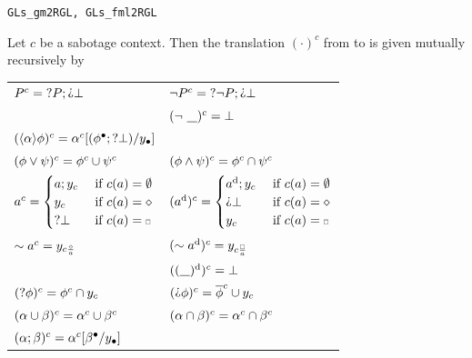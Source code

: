 \begin{bdefinition}
\texttt{GLs\_gm2RGL, GLs\_fml2RGL}

Let $c$ be a sabotage context. Then the translation $(\cdot)^c$ from \GLs{} to \RGL{} is given mutually recursively by
\begin{center}
\begin{tabular}{l l}
    $ \GLsrl{c}{P} = \Test P; \DTest\bot$ 
    & $\GLsrl{c}{\neg P } = \Test\neg P; \DTest\bot$ \\
    & $\GLsrl{c}{(\neg\  \underline{\hspace{8pt}})} = \bot$ \\
    $\GLsrl{c}{(\langle\alpha\rangle\phi)} = \GLsrl{c}{\alpha}[(\GLsrl{\bullet}{\phi}; \Test\bot)/y_\bullet]$ \\
    $\GLsrl{c}{(\phi\vee\psi)}=\GLsrl{c}{\phi}\cup \GLsrl{c}{\psi}$ 
    & $\GLsrl{c}{(\phi\wedge\psi)}=\GLsrl{c}{\phi}\cap \GLsrl{c}{\psi}$ \\
    $\GLsrl{c}{a} =\begin{cases}
        a; y_c & \text{ if } c(a) = \emptyset \\
        y_c     & \text{ if } c(a) = \diamond \\
        \Test \bot  & \text{ if } c(a) = \ssquare
    \end{cases}$ 
    & $\GLsrl{c}{(\Dual{a})} =\begin{cases}
        \Dual{a}; y_c & \text{ if } c(a) = \emptyset \\
        \DTest\bot     & \text{ if } c(a) = \diamond \\
        y_c  & \text{ if } c(a) = \ssquare
    \end{cases}$ \\
    $\GLsrl{c}{\sim a} = y_{c\frac{\diamond}{a}}$ 
    & $\GLsrl{c}{(\Dual{\sim a})} = y_{c\frac{\ssquare}{a}}$ \\
    & $\GLsrl{c}{(\Dual{(\underline{\hspace{8pt}})})} = \bot$ \\
    $\GLsrl{c}{(\Test\phi)}=\GLsrl{c}{\phi}\cap y_c$
    & $\GLsrl{c}{(\DTest\phi)}=\GLsrl{c}{\overline \phi}\cup y_c$ \\
    $\GLsrl{c}{(\alpha\cup\beta)}=\GLsrl{c}{\alpha}\cup \GLsrl{c}{\beta}$ 
    & $\GLsrl{c}{(\alpha\cap\beta)}=\GLsrl{c}{\alpha}\cap \GLsrl{c}{\beta}$ \\
    $\GLsrl{c}{(\alpha;\beta)}=\GLsrl{c}{\alpha}[\GLsrl{\bullet}{\beta}/y_\bullet]$ \\
    \end{tabular}
    \end{center}


\end{bdefinition}
